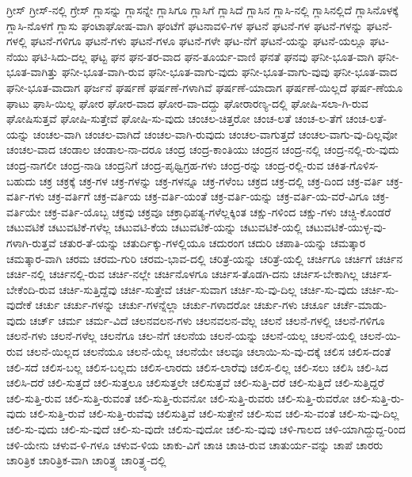 {ಗ್ರೀಸ್
ಗ್ರೀಸ್-ನಲ್ಲಿ
ಗ್ರೇಸ್
ಗ್ಲಾಸನ್ನು
ಗ್ಲಾಸನ್ನೇ
ಗ್ಲಾಸಿಗೂ
ಗ್ಲಾಸಿಗೆ
ಗ್ಲಾಸಿದೆ
ಗ್ಲಾಸಿನ
ಗ್ಲಾಸಿ-ನಲ್ಲಿ
ಗ್ಲಾಸಿನಲ್ಲಿದೆ
ಗ್ಲಾಸಿನೊಳಕ್ಕೆ
ಗ್ಲಾಸಿ-ನೊಳಗೆ
ಗ್ಲಾಸು
ಘಂಟಾಘೋಷ-ವಾಗಿ
ಘಂಟೆಗೆ
ಘಟನಾವಳಿ-ಗಳ
ಘಟನೆ
ಘಟನೆ-ಗಳ
ಘಟನೆ-ಗಳನ್ನು
ಘಟನೆ-ಗಳಲ್ಲಿ
ಘಟನೆ-ಗಳಿಗೂ
ಘಟನೆ-ಗಳು
ಘಟನೆ-ಗಳೂ
ಘಟನೆ-ಗಳೇ
ಘಟ-ನೆಗೆ
ಘಟನೆ-ಯನ್ನು
ಘಟನೆ-ಯಲ್ಲೂ
ಘಟ-ನೆಯು
ಘಟಿ-ಸಿದು-ದಲ್ಲ
ಘಟ್ಟ
ಘನ
ಘನ-ತರ-ವಾದ
ಘನ-ತೂರ್ಯ-ವಾಣಿ
ಘನತೆ
ಘನವು
ಘನೀ-ಭೂತ-ವಾಗಿ
ಘನೀ-ಭೂತ-ವಾಗಿತ್ತು
ಘನೀ-ಭೂತ-ವಾಗಿ-ರುವ
ಘನೀ-ಭೂತ-ವಾಗು-ವುದು
ಘನೀ-ಭೂತ-ವಾಗು-ವುವು
ಘನೀ-ಭೂತ-ವಾದ
ಘನೀ-ಭೂತ-ವಾದಾಗ
ಘರ್ಜನೆ
ಘರ್ಷಣೆ
ಘರ್ಷಣೆ-ಗಳಾಗಿವೆ
ಘರ್ಷಣೆ-ಯಾದಾಗ
ಘರ್ಷಣೆ-ಯಿಲ್ಲದೆ
ಘರ್ಷ-ಣೆಯೂ
ಘಾಟು
ಘಾಸಿ-ಯಿಲ್ಲ
ಘೋರ
ಘೋರ-ವಾದ
ಘೋರ-ವಾ-ದದ್ದು
ಘೋರಾರಣ್ಯ-ದಲ್ಲಿ
ಘೋಷಿ-ಸಲಾ-ಗಿ-ರುವ
ಘೋಷಿಸುತ್ತವೆ
ಘೋಷಿ-ಸುತ್ತೇವೆ
ಘೋಷಿ-ಸು-ವುದು
ಚಂಚಲ-ಚಿತ್ತರೋ
ಚಂಚ-ಲತೆ
ಚಂಚ-ಲ-ತೆಗೆ
ಚಂಚ-ಲತೆ-ಯನ್ನು
ಚಂಚಲ-ವಾಗಿ
ಚಂಚಲ-ವಾಗಿದೆ
ಚಂಚಲ-ವಾಗಿ-ರುವುದು
ಚಂಚಲ-ವಾಗುತ್ತದೆ
ಚಂಚಲ-ವಾಗು-ವು-ದಿಲ್ಲವೋ
ಚಂಚಲ-ವಾದ
ಚಂಡಾಲ
ಚಂಡಾಲ-ನಾ-ದರೂ
ಚಂದ್ರ
ಚಂದ್ರ-ಕಾಂತಿಯು
ಚಂದ್ರನ
ಚಂದ್ರ-ನಲ್ಲಿ
ಚಂದ್ರ-ನಲ್ಲಿ-ರು-ವುದು
ಚಂದ್ರ-ನಾಗಲೀ
ಚಂದ್ರ-ನಾಡಿ
ಚಂದ್ರನಿಗೆ
ಚಂದ್ರ-ಪೃಥ್ವಿಗ್ರಹ-ಗಳು
ಚಂದ್ರ-ರನ್ನು
ಚಂದ್ರ-ರಲ್ಲಿ-ರುವ
ಚಕಿತ-ಗೊಳಿಸ-ಬಹುದು
ಚಕ್ರ
ಚಕ್ರಕ್ಕೆ
ಚಕ್ರ-ಗಳ
ಚಕ್ರ-ಗಳನ್ನು
ಚಕ್ರ-ಗಳನ್ನೂ
ಚಕ್ರ-ಗಳೆಂಬ
ಚಕ್ರದ
ಚಕ್ರ-ದಲ್ಲಿ
ಚಕ್ರ-ದಿಂದ
ಚಕ್ರ-ವರ್ತಿ
ಚಕ್ರ-ವರ್ತಿ-ಗಳು
ಚಕ್ರ-ವರ್ತಿಗೆ
ಚಕ್ರ-ವರ್ತಿಯ
ಚಕ್ರ-ವರ್ತಿ-ಯಂತೆ
ಚಕ್ರ-ವರ್ತಿ-ಯನ್ನು
ಚಕ್ರ-ವರ್ತಿ-ಯ-ವರೆ-ವಿಗೂ
ಚಕ್ರ-ವರ್ತಿಯೇ
ಚಕ್ರ-ವರ್ತಿ-ಯೊಬ್ಬ
ಚಕ್ರವು
ಚಕ್ರವೂ
ಚಕ್ರಾಧಿಪತ್ಯ-ಗಳೆಲ್ಲಕ್ಕಿಂತ
ಚಕ್ಷು-ಗಳಿಂದ
ಚಕ್ಷು-ಗಳು
ಚಚ್ಚಿ-ಕೊಂಡರೆ
ಚಟುವಟಿಕೆ
ಚಟುವಟಿಕೆ-ಗಳೆಲ್ಲ
ಚಟುವಟಿ-ಕೆಯ
ಚಟುವಟಿಕೆ-ಯನ್ನು
ಚಟುವಟಿಕೆ-ಯಲ್ಲಿ
ಚಟುವಟಿಕೆ-ಯುಳ್ಳ-ವು-ಗಳಾಗಿ-ರುತ್ತವೆ
ಚತುರ-ತೆ-ಯನ್ನು
ಚತುರ್ದಿಕ್ಕು-ಗಳಲ್ಲಿಯೂ
ಚದುರಂಗ
ಚದುರಿ
ಚಪಾತಿ-ಯನ್ನು
ಚಮತ್ಕಾರ
ಚಮತ್ಕಾರ-ವಾಗಿ
ಚರಮ
ಚರಮ-ಗುರಿ
ಚರಮ-ಭಾವ-ದಲ್ಲಿ
ಚರಿತ್ರೆ-ಯನ್ನು
ಚರಿತ್ರೆ-ಯಲ್ಲಿ
ಚರ್ಚಿಗೂ
ಚರ್ಚಿಗೆ
ಚರ್ಚಿನ
ಚರ್ಚಿ-ನಲ್ಲಿ
ಚರ್ಚಿನಲ್ಲಿ-ರುವ
ಚರ್ಚಿ-ನಲ್ಲೇ
ಚರ್ಚಿನೊಳಗೂ
ಚರ್ಚಿಸ-ತೊಡಗಿ-ದನು
ಚರ್ಚಿಸ-ಬೇಕಾಗಿಲ್ಲ
ಚರ್ಚಿಸ-ಬೇಕೆಂದಿ-ರುವ
ಚರ್ಚಿ-ಸುತ್ತಿದ್ದೆವು
ಚರ್ಚಿ-ಸುತ್ತೇವೆ
ಚರ್ಚಿ-ಸುವಾಗ
ಚರ್ಚಿ-ಸು-ವು-ದಿಲ್ಲ
ಚರ್ಚಿ-ಸು-ವುದು
ಚರ್ಚಿ-ಸು-ವುದೇಕೆ
ಚರ್ಚು
ಚರ್ಚು-ಗಳನ್ನು
ಚರ್ಚು-ಗಳನ್ನೆಲ್ಲಾ
ಚರ್ಚು-ಗಳಾದರೋ
ಚರ್ಚು-ಗಳು
ಚರ್ಚೂ
ಚರ್ಚೆ-ಮಾಡು-ವುದು
ಚರ್ಚ್
ಚರ್ಮ
ಚರ್ಮ-ವಿದೆ
ಚಲನವಲನ-ಗಳು
ಚಲನವಲನ-ವೆಲ್ಲ
ಚಲನೆ
ಚಲನೆ-ಗಳಲ್ಲಿ
ಚಲನೆ-ಗಳಿಗೂ
ಚಲನೆ-ಗಳು
ಚಲನೆ-ಗಳೆಲ್ಲ
ಚಲನೆಗೂ
ಚಲ-ನೆಗೆ
ಚಲನೆಯ
ಚಲನೆ-ಯನ್ನು
ಚಲನೆ-ಯಲ್ಲ
ಚಲನೆ-ಯಲ್ಲಿ
ಚಲನೆ-ಯಿ-ರುವ
ಚಲನೆ-ಯಿಲ್ಲದ
ಚಲನೆಯೂ
ಚಲನೆ-ಯೆಲ್ಲ
ಚಲನೆಯೇ
ಚಲವೂ
ಚಲಾಯಿ-ಸು-ವು-ದಕ್ಕೆ
ಚಲಿಸ
ಚಲಿಸ-ದಂತೆ
ಚಲಿ-ಸದೆ
ಚಲಿಸ-ಬಲ್ಲ
ಚಲಿಸ-ಬಲ್ಲದು
ಚಲಿಸ-ಲಾರದು
ಚಲಿಸ-ಲಾರೆವು
ಚಲಿಸ-ಲಿಲ್ಲ
ಚಲಿ-ಸಲು
ಚಲಿಸಿ
ಚಲಿ-ಸಿದ
ಚಲಿಸಿ-ದರೆ
ಚಲಿ-ಸುತ್ತದೆ
ಚಲಿ-ಸುತ್ತಲೂ
ಚಲಿಸುತ್ತಲೇ
ಚಲಿಸುತ್ತವೆ
ಚಲಿ-ಸುತ್ತಿ-ದರೆ
ಚಲಿ-ಸುತ್ತಿದೆ
ಚಲಿ-ಸುತ್ತಿದ್ದರೆ
ಚಲಿ-ಸುತ್ತಿ-ರುವ
ಚಲಿ-ಸುತ್ತಿ-ರುವಂತೆ
ಚಲಿ-ಸುತ್ತಿ-ರುವನೋ
ಚಲಿ-ಸುತ್ತಿ-ರುವರು
ಚಲಿ-ಸುತ್ತಿ-ರುವರೋ
ಚಲಿ-ಸುತ್ತಿ-ರು-ವುದು
ಚಲಿ-ಸುತ್ತಿ-ರುವೆ
ಚಲಿ-ಸುತ್ತಿ-ರುವೆವು
ಚಲಿಸುತ್ತಿವೆ
ಚಲಿ-ಸುತ್ತೇನೆ
ಚಲಿ-ಸುವ
ಚಲಿ-ಸು-ವಂತೆ
ಚಲಿ-ಸು-ವು-ದಿಲ್ಲ
ಚಲಿ-ಸು-ವುದು
ಚಲಿ-ಸು-ವುದೆ
ಚಲಿ-ಸು-ವುದೇ
ಚಲಿಸು-ವುದೋ
ಚಲಿ-ಸು-ವುವು
ಚಳಿ-ಗಾಲದ
ಚಳಿ-ಯಾಗಿದ್ದುದ್ದ-ರಿಂದ
ಚಳಿ-ಯೇನು
ಚಳುವ-ಳಿ-ಗಳೂ
ಚಳುವ-ಳಿಯ
ಚಾಕು-ವಿಗೆ
ಚಾಚಿ
ಚಾಚಿ-ರುವ
ಚಾತುರ್ಯ-ವನ್ನು
ಚಾಪೆ
ಚಾರರು
ಚಾರಿತ್ರಿಕ
ಚಾರಿತ್ರಿಕ-ವಾಗಿ
ಚಾರಿತ್ರ್ಯ
ಚಾರಿತ್ರ್ಯ-ದಲ್ಲಿ
}

